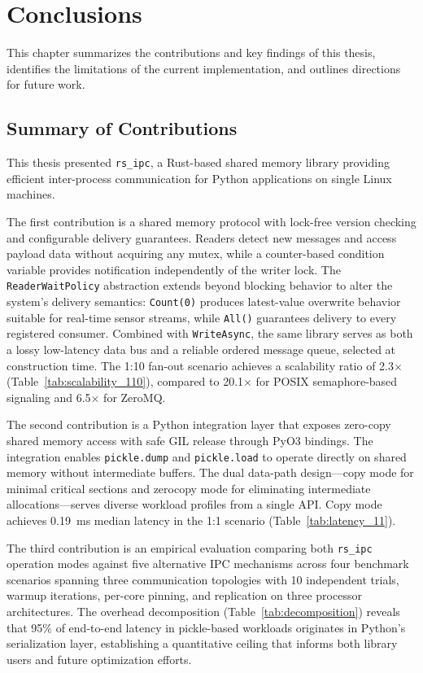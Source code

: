 \chapter{Conclusions}
\label{chap:conclusions}

This chapter summarizes the contributions and key findings of this thesis, identifies the limitations of the current implementation, and outlines directions for future work.

\section{Summary of Contributions}

This thesis presented \texttt{rs\_ipc}, a Rust-based shared memory library providing efficient inter-process communication for Python applications on single Linux machines.

The first contribution is a shared memory protocol with lock-free version checking and configurable delivery guarantees. Readers detect new messages and access payload data without acquiring any mutex, while a counter-based condition variable provides notification independently of the writer lock. The \texttt{ReaderWaitPolicy} abstraction extends beyond blocking behavior to alter the system's delivery semantics: \texttt{Count(0)} produces latest-value overwrite behavior suitable for real-time sensor streams, while \texttt{All()} guarantees delivery to every registered consumer. Combined with \texttt{WriteAsync}, the same library serves as both a lossy low-latency data bus and a reliable ordered message queue, selected at construction time. The 1:10 fan-out scenario achieves a scalability ratio of 2.3$\times$ (Table~\ref{tab:scalability_110}), compared to 20.1$\times$ for POSIX semaphore-based signaling and 6.5$\times$ for ZeroMQ.

The second contribution is a Python integration layer that exposes zero-copy shared memory access with safe GIL release through PyO3 bindings. The integration enables \texttt{pickle.dump} and \texttt{pickle.load} to operate directly on shared memory without intermediate buffers. The dual data-path design---copy mode for minimal critical sections and zerocopy mode for eliminating intermediate allocations---serves diverse workload profiles from a single API. Copy mode achieves 0.19~ms median latency in the 1:1 scenario (Table~\ref{tab:latency_11}).

The third contribution is an empirical evaluation comparing both \texttt{rs\_ipc} operation modes against five alternative IPC mechanisms across four benchmark scenarios spanning three communication topologies with 10 independent trials, warmup iterations, per-core pinning, and replication on three processor architectures. The overhead decomposition (Table~\ref{tab:decomposition}) reveals that 95\% of end-to-end latency in pickle-based workloads originates in Python's serialization layer, establishing a quantitative ceiling that informs both library users and future optimization efforts.

